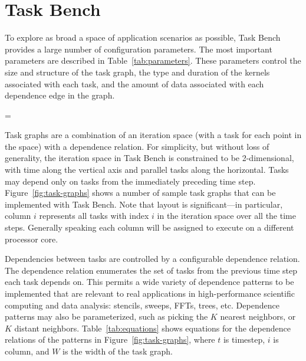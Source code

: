 \section{Task Bench}
\label{sec:task-bench}




To explore as broad a space of application scenarios as possible, Task
Bench provides a large number of configuration parameters. The most
important parameters are described in
Table~\ref{tab:parameters}. These parameters control the size and
structure of the task graph, the type and duration of the kernels
associated with each task, and the amount of data associated with
each dependence edge in the graph.

\brokenpenalty=\oldbrokenpenalty

Task graphs are a combination of an iteration space (with a task for
each point in the space) with a dependence relation.
For simplicity, but without loss of generality, the iteration space in
Task Bench is constrained to be 2-dimensional, with time along
the vertical axis and parallel tasks along the
horizontal. Tasks may depend only on tasks from the immediately
preceding time step. Figure~\ref{fig:task-graphs} shows a number of sample task
graphs that can be implemented with Task Bench. Note that layout is
significant---in particular, column $i$ represents all tasks
with index $i$ in the iteration space over all the time
steps. Generally speaking each column will be
assigned to execute on a different processor core.

Dependencies between tasks are controlled by a configurable dependence
relation. The
dependence relation enumerates the set of tasks from the
previous time step each task depends on. This permits a wide variety
of dependence patterns to be implemented that are relevant to real
applications in high-performance scientific computing and data analysis: stencils,
sweeps, FFTs, trees, etc. Dependence patterns may also be
parameterized, such as picking the $K$ nearest neighbors, or $K$
distant neighbors. Table~\ref{tab:equations} shows equations for the
dependence relations of the patterns in Figure~\ref{fig:task-graphs},
where $t$ is timestep, $i$ is column, and $W$ is the width of the task
graph.




